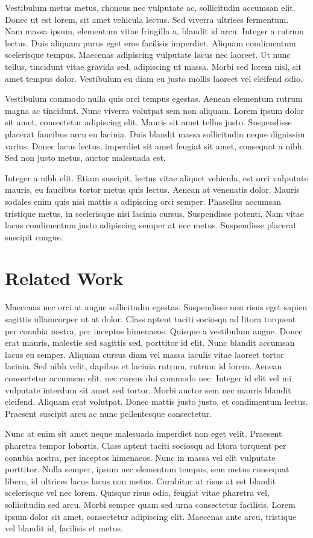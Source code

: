 Vestibulum metus metus, rhoncus nec vulputate ac, sollicitudin accumsan
elit. Donec ut est lorem, sit amet vehicula lectus. Sed viverra ultrices
fermentum. Nam massa ipsum, elementum vitae fringilla a, blandit id
arcu. Integer a rutrum lectus. Duis aliquam purus eget eros facilisis
imperdiet. Aliquam condimentum scelerisque tempus. Maecenas adipiscing
vulputate lacus nec laoreet. Ut nunc tellus, tincidunt vitae gravida
sed, adipiscing ut massa. Morbi sed lorem nisl, sit amet tempus dolor.
Vestibulum eu diam eu justo mollis laoreet vel eleifend odio.

Vestibulum commodo nulla quis orci tempus egestas. Aenean elementum
rutrum magna ac tincidunt. Nunc viverra volutpat sem non aliquam.
Lorem ipsum dolor sit amet, consectetur adipiscing elit. Mauris sit
amet tellus justo. Suspendisse placerat faucibus arcu eu lacinia.
Duis blandit massa sollicitudin neque dignissim varius. Donec lacus
lectus, imperdiet sit amet feugiat sit amet, consequat a nibh. Sed
non justo metus, auctor malesuada est.

Integer a nibh elit. Etiam suscipit, lectus vitae aliquet vehicula,
est orci vulputate mauris, eu faucibus tortor metus quis lectus. Aenean
at venenatis dolor. Mauris sodales enim quis nisi mattis a adipiscing
orci semper. Phasellus accumsan tristique metus, in scelerisque nisi
lacinia cursus. Suspendisse potenti. Nam vitae lacus condimentum justo
adipiscing semper at nec metus. Suspendisse placerat suscipit congue. 

\section{Related Work}

Maecenas nec orci at augue sollicitudin egestas. Suspendisse non risus
eget sapien sagittis ullamcorper ut at dolor. Class aptent taciti
sociosqu ad litora torquent per conubia nostra, per inceptos himenaeos.
Quisque a vestibulum augue. Donec erat mauris, molestie sed sagittis
sed, porttitor id elit. Nunc blandit accumsan lacus eu semper. Aliquam
cursus diam vel massa iaculis vitae laoreet tortor lacinia. Sed nibh
velit, dapibus et lacinia rutrum, rutrum id lorem. Aenean consectetur
accumsan elit, nec cursus dui commodo nec. Integer id elit vel mi
vulputate interdum sit amet sed tortor. Morbi auctor sem nec mauris
blandit eleifend. Aliquam erat volutpat. Donec mattis justo justo,
et condimentum lectus. Praesent suscipit arcu ac nunc pellentesque
consectetur.

Nunc at enim sit amet neque malesuada imperdiet non eget velit. Praesent
pharetra tempor lobortis. Class aptent taciti sociosqu ad litora torquent
per conubia nostra, per inceptos himenaeos. Nunc in massa vel elit
vulputate porttitor. Nulla semper, ipsum nec elementum tempus, sem
metus consequat libero, id ultrices lacus lacus non metus. Curabitur
at risus at est blandit scelerisque vel nec lorem. Quisque risus odio,
feugiat vitae pharetra vel, sollicitudin sed arcu. Morbi semper quam
sed urna consectetur facilisis. Lorem ipsum dolor sit amet, consectetur
adipiscing elit. Maecenas ante arcu, tristique vel blandit id, facilisis
et metus.

